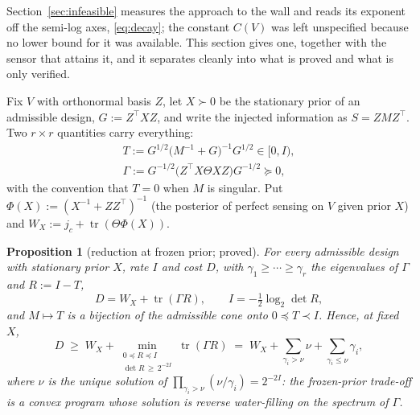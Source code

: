 \documentclass[journal]{IEEEtran}
\newtheorem{proposition}{Proposition}
\theoremstyle{remark}
\begin{document}
Section~\ref{sec:infeasible} measures the approach to the wall and reads its
exponent off the semi-log axes, \eqref{eq:decay}; the constant $C(V)$ was left
unspecified because no lower bound for it was available. This section gives one,
together with the sensor that attains it, and it separates cleanly into what is
proved and what is only verified.

Fix $V$ with orthonormal basis $Z$, let $X\succ0$ be the stationary prior of an
admissible design, $G:=Z^{\top}XZ$, and write the injected information as
$S=ZMZ^{\top}$. Two $r\times r$ quantities carry everything:
\begin{equation}
 \begin{gathered}
 T:=G^{1/2}\big(M^{-1}+G\big)^{-1}G^{1/2}\in[0,I),\\
 \Gamma:=G^{-1/2}\big(Z^{\top}X\Theta XZ\big)G^{-1/2}\succeq0,
 \end{gathered}
\label{eq:TG}
\end{equation}
with the convention that $T=0$ when $M$ is singular. Put
$\Phi(X):=(X^{-1}+ZZ^{\top})^{-1}$ (the posterior of perfect sensing on $V$ given
prior $X$) and $W_X:=j_c+\operatorname{tr}(\Theta\Phi(X))$.

\begin{proposition}[reduction at frozen prior; proved]
\label{pr:freeze}
For every admissible design with stationary prior $X$, rate $I$ and cost $D$,
with $\gamma_1\ge\cdots\ge\gamma_r$ the eigenvalues of $\Gamma$ and $R:=I-T$,
\begin{equation}
 D=W_X+\operatorname{tr}(\Gamma R),\qquad
 I=-\tfrac12\log_2\det R,
\label{eq:red}
\end{equation}
and $M\mapsto T$ is a bijection of the admissible cone onto $0\preceq T\prec I$.
Hence, at fixed $X$,
\begin{equation}
 D\;\ge\;W_X+\min_{\substack{0\preceq R\preceq I\\ \det R\,\ge\,2^{-2I}}}
 \operatorname{tr}(\Gamma R)
 \;=\;W_X+\sum_{\gamma_i>\nu}\nu+\sum_{\gamma_i\le\nu}\gamma_i,
\label{eq:wf}
\end{equation}
where $\nu$ is the unique solution of $\prod_{\gamma_i>\nu}(\nu/\gamma_i)=2^{-2I}$:
the frozen-prior trade-off is a convex program whose solution is reverse
water-filling on the spectrum of $\Gamma$.
\end{proposition}
\end{document}
